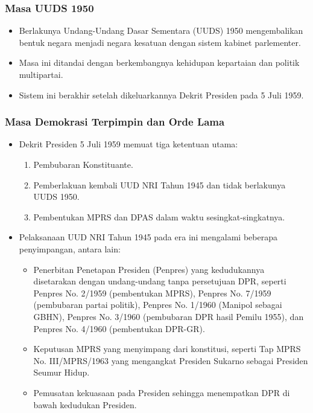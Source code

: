 \subsubsection{Masa UUDS 1950}
\begin{itemize}
\item Berlakunya Undang-Undang Dasar Sementara (UUDS) 1950 mengembalikan bentuk negara menjadi negara kesatuan dengan sistem kabinet parlementer.
\item Masa ini ditandai dengan berkembangnya kehidupan kepartaian dan politik multipartai.
\item Sistem ini berakhir setelah dikeluarkannya Dekrit Presiden pada 5 Juli 1959.
\end{itemize}

\subsubsection{Masa Demokrasi Terpimpin dan Orde Lama}
\begin{itemize}
\item Dekrit Presiden 5 Juli 1959 memuat tiga ketentuan utama:
  \begin{enumerate}
  \item Pembubaran Konstituante.
  \item Pemberlakuan kembali UUD NRI Tahun 1945 dan tidak berlakunya UUDS 1950.
  \item Pembentukan MPRS dan DPAS dalam waktu sesingkat-singkatnya.
  \end{enumerate}
\item Pelaksanaan UUD NRI Tahun 1945 pada era ini mengalami beberapa penyimpangan, antara lain:
  \begin{itemize}
  \item Penerbitan Penetapan Presiden (Penpres) yang kedudukannya disetarakan dengan undang-undang tanpa persetujuan DPR, seperti Penpres No. 2/1959 (pembentukan MPRS), Penpres No. 7/1959 (pembubaran partai politik), Penpres No. 1/1960 (Manipol sebagai GBHN), Penpres No. 3/1960 (pembubaran DPR hasil Pemilu 1955), dan Penpres No. 4/1960 (pembentukan DPR-GR).
  \item Keputusan MPRS yang menyimpang dari konstitusi, seperti Tap MPRS No. III/MPRS/1963 yang mengangkat Presiden Sukarno sebagai Presiden Seumur Hidup.
  \item Pemusatan kekuasaan pada Presiden sehingga menempatkan DPR di bawah kedudukan Presiden.
  \end{itemize}
\end{itemize}

